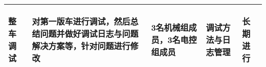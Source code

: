 \begin{longtable}{ p{2cm} | p{3cm} | p{3cm} | p{4.8cm} | p{2cm} |}
    \hline
    
        \begin{center}
            整车调试
        \end{center} &
        \begin{center}
            对第一版车进行调试，然后总结问题并做好调试日志与问题解决方案等，针对问题进行修改
        \end{center} &
        \begin{center}
            3名机械组成员，3名电控组成员
        \end{center} &
        \begin{center}
            调试方法与日志管理
        \end{center} &
        \begin{center}
            长期进行
        \end{center}\\

    \hline
    
\end{longtable}
